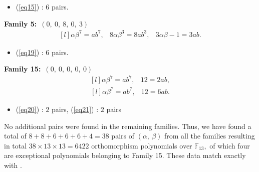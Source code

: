 \documentclass[12pt,a4wide, reqno]{amsart}
\theoremstyle{definition}
\theoremstyle{remark}
\numberwithin{equation}{section}
\begin{document}
\begin{itemize} 
    \item 
    (\ref{eq15}) : $6$ pairs.
\end{itemize}
\textbf{Family 5:}~$(0,~0,~8,~0,~3)$ 
\begin{equation}\label{eq19}
    \begin{matrix*}[l]
         \alpha \beta ^7=ab^7, & 8\alpha \beta^3=8ab^3, & 3\alpha\beta -1=3ab.
    \end{matrix*}
\end{equation}
\begin{itemize}
    \item 
    (\ref{eq19}) : $6$ pairs.
\end{itemize}
\textbf{Family 15:}~$(0,~0,~0,~0,~0)$ 
\begin{equation}\label{eq20}
    \begin{matrix*}[l]
         \alpha \beta ^7=ab^7, & 12=2ab,
    \end{matrix*}
\end{equation}
\begin{equation}\label{eq21}
    \begin{matrix*}[l]
        \alpha \beta ^7=ab^7, &  12=6ab.
    \end{matrix*}
\end{equation}
\begin{itemize}
    \item 
    (\ref{eq20}) : $2$ pairs, (\ref{eq21}) : $2$ pairs
\end{itemize}
No additional pairs were found in the remaining families. Thus, we have found a total of $8+8+6+6+6+4=38$ pairs of $(\alpha,~\beta)$ from all the families resulting in total $38\times 13 \times 13=6422$ orthomorphism polynomials over $\mathbb{F}_{13},$ of which four are exceptional polynomials belonging to Family 15. These data match exactly with \cite[Table~3.2]{shallue}.
\end{document}

